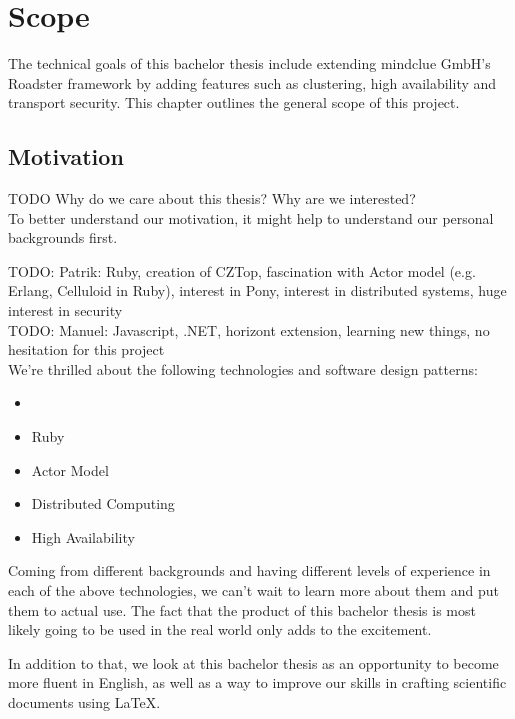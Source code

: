 \chapter{Scope}
The technical goals of this bachelor thesis include extending mindclue GmbH's
Roadster framework by adding features such as clustering, high availability and
transport security. This chapter outlines the general scope of this project.

\section{Motivation}
TODO Why do we care about this thesis? Why are we interested?\\

To better understand our motivation, it might help to understand our personal backgrounds first.

TODO: Patrik: Ruby, creation of CZTop, fascination with Actor model (e.g. Erlang, Celluloid in Ruby), interest in Pony, interest in distributed systems, huge interest in security\\
TODO: Manuel: Javascript, .NET, horizont extension, learning new things, no hesitation for this project\\

We're thrilled about the following technologies and software design patterns:

\begin{itemize}
	\item \zmq
	\item Ruby
	\item Actor Model
	\item Distributed Computing
	\item High Availability
\end{itemize}


Coming from different backgrounds and having different levels of experience in
each of the above technologies, we can't wait to learn more about them and put
them to actual use. The fact that the product of this bachelor thesis is most
likely going to be used in the real world only adds to the excitement.

In addition to that, we look at this bachelor thesis as an opportunity to
become more fluent in English, as well as a way to improve our skills in
crafting scientific documents using {\LaTeX}.

